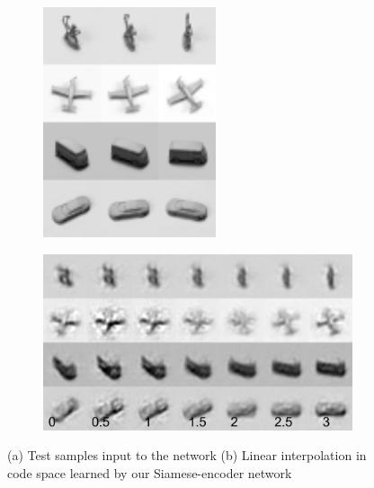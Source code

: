 \documentclass{article} %
\begin{document}
\begin{figure}
  \centering
   \begin{subfigure}[b]{0.193\textwidth}
        \includegraphics[width=\textwidth]{./figures/taco/original.png}
        \caption{}
          \label{fig:sample}
    \end{subfigure} 
  \begin{subfigure}[b]{0.45\textwidth}
        \includegraphics[width=\textwidth]{./figures/taco/siamese_interp_num.png} 
        \caption{}
          \label{fig:baseline}
  \end{subfigure}
  \caption{(a) Test samples input to the network (b) Linear interpolation in code space learned by our Siamese-encoder network}
\end{figure}
\end{document}
